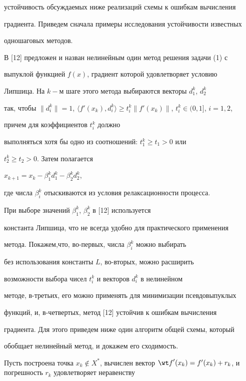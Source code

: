 устойчивость обсуждаемых ниже реализаций схемы к ошибкам вычисления


градиента. Приведем сначала примеры исследования устойчивости известных


одношаговых методов.





В [12] предложен и назван нелинейным один метод решения задачи (1) с


выпуклой функцией $f(x)$, градиент которой удовлетворяет условию


Липшица. На $k-$м шаге этого метода выбираются векторы $d_1^k$, $d_2^k$


так, чтобы $\|{d_i^k}\|=1$, $\langle {{f}'(x_k),d_i^k}\rangle


\ge t_i^k\|{{f}'(x_k)}\|$, $t_i^k\in (0,1]$, $i=1,2$,


причем для коэффициентов $t_i^k$ должно


выполняться хотя бы одно из соотношений: $t_1^k\ge t_1>0$ или


$t_2^k\ge t_2>0$. Затем полагается


$x_{k+1}=x_k-\beta_1^kd_1^k-\beta_2^kd_2^k$,


где числа $\beta_i^k$ отыскиваются из условия релаксационности процесса.


При выборе значений $\beta_1^k$, $\beta_2^k$ в [12] используется


константа Липшица, что не всегда удобно для практического применения


метода. Покажем,что, во-первых, числа $\beta_i^k$ можно выбирать


без использования константы $L$, во-вторых, можно расширить


возможности выбора чисел $t_i^k$ и векторов $d_i^k$ в нелинейном


методе, в-третьих, его можно применять для минимизации псевдовыпуклых


функций, и, в-четвертых, метод [12] устойчив к ошибкам вычисления


градиента. Для этого приведем ниже один алгоритм общей схемы, который


обобщает нелинейный метод, и докажем его сходимость.





Пусть построена точка $x_k\notin X^{*}$, вычислен вектор ${\wt


f}'(x_k)={f}'(x_k)+r_k$, и погрешность $r_k$ удовлетворяет неравенству


